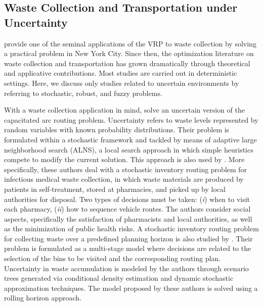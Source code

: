 \documentclass[preprint,11pt,authoryear]{elsarticle}
\begin{document}
\subsection{Waste Collection and Transportation under Uncertainty}\label{VRP}
\cite{Beltrami1974} provide one of the seminal applications of the VRP to waste collection by solving a practical problem in New York City. Since then, the optimization literature on waste collection and transportation has grown dramatically through theoretical and applicative contributions. Most studies are carried out in deterministic settings.
Here, we discuss only studies related to uncertain environments by referring to stochastic, robust, and fuzzy problems.    

With a waste collection application in mind, \cite{Laporte2010} solve an uncertain version of the capacitated arc routing problem. Uncertainty refers to waste levels represented by random variables with known probability distributions. Their problem is formulated within a stochastic framework and tackled 
by means of adaptive large neighborhood search (ALNS), a local search approach in which simple heuristics compete to modify the current solution. This approach is also used by \cite{Nolz2014}. More specifically, these authors deal with a stochastic inventory routing problem  for infectious medical waste collection, in which waste materials are produced by patients in self-treatment, stored at pharmacies, and picked up by local authorities for disposal. Two types of decisions must be taken: (\textit{i}) when to visit each pharmacy, (\textit{ii}) how to sequence vehicle routes. The authors consider social aspects, specifically the satisfaction of pharmacists and local authorities, as well as the minimization of public health risks.  
%
A stochastic inventory routing problem for collecting waste over a predefined planning horizon is also studied by \cite{Spinelli2025}. Their problem is formulated as a multi-stage model where decisions are related to the selection of the bins to be visited and the corresponding routing plan. Uncertainty in waste accumulation is modeled by the authors through scenario trees generated via conditional density estimation and dynamic stochastic approximation techniques. The model proposed by these authors is solved using a rolling horizon approach. 
\end{document}
